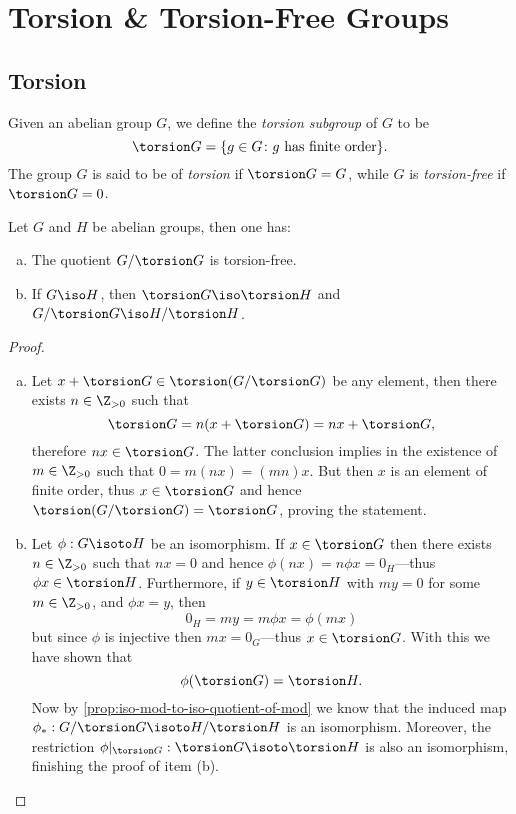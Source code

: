 \section{Torsion \& Torsion-Free Groups}

\subsection{Torsion}

\begin{definition}
\label{def:torsion-subgroup}
Given an abelian group \(G\), we define the \emph{torsion subgroup} of \(G\) to be
\[
\torsion G = \{g \in G \colon g \text{ has finite order}\}.
\]
The group \(G\) is said to be of \emph{torsion} if \(\torsion G = G\), while
\(G\) is \emph{torsion-free} if \(\torsion G = 0\).
\end{definition}

\begin{corollary}
\label{cor:torsion-subgrp-first-properties}
Let \(G\) and \(H\) be abelian groups, then one has:
\begin{enumerate}[(a)]\setlength\itemsep{0em}
\item The quotient \(G/\torsion G\) is torsion-free.
\item If \(G \iso H\), then \(\torsion G \iso \torsion H\) and
  \(G/\torsion G \iso H/\torsion H\).
\end{enumerate}
\end{corollary}

\begin{proof}
\begin{enumerate}[(a)]\setlength\itemsep{0em}
\item Let \(x + \torsion G \in \torsion(G/\torsion G)\) be any element, then
  there exists \(n \in \Z_{>0}\) such that
  \[
  \torsion G = n(x + \torsion G) = n x + \torsion G,
  \]
  therefore \(n x \in \torsion G\). The latter conclusion implies in the
  existence of \(m \in \Z_{>0}\) such that \(0 = m (n x) = (m n) x\). But then
  \(x\) is an element of finite order, thus \(x \in \torsion G\) and hence
  \(\torsion(G/\torsion G) = \torsion G\), proving the statement.

\item Let \(\phi: G \isoto H\) be an isomorphism. If \(x \in \torsion G\) then
  there exists \(n \in \Z_{>0}\) such that \(n x = 0\) and hence \(\phi(n x) = n
  \phi x = 0_H\)---thus \(\phi x \in \torsion H\). Furthermore, if \(y \in
  \torsion H\) with \(m y = 0\) for some \(m \in \Z_{> 0}\), and \(\phi x = y\),
  then
  \[
  0_H = m y = m \phi x = \phi(m x)
  \]
  but since \(\phi\) is injective then \(m x = 0_G\)---thus
  \(x \in \torsion G\). With this we have shown that
  \[
  \phi(\torsion G) = \torsion H.
  \]
  Now by \cref{prop:iso-mod-to-iso-quotient-of-mod} we know that the induced map
  \(\phi_{*}: G/\torsion G \isoto H/\torsion H\) is an isomorphism. Moreover,
  the restriction \(\phi|_{\torsion G}: \torsion G \isoto \torsion H\) is also
  an isomorphism, finishing the proof of item (b).
\end{enumerate}
\end{proof}

